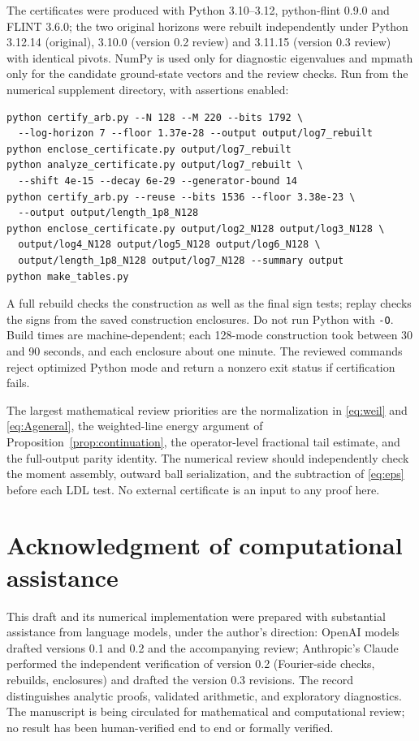 \documentclass[11pt]{article}
\numberwithin{equation}{section}
\theoremstyle{definition}
\theoremstyle{remark}
\begin{document}
The certificates were produced with Python 3.10--3.12, python-flint 0.9.0 and
FLINT 3.6.0; the two original horizons were rebuilt independently under Python
3.12.14 (original), 3.10.0 (version 0.2 review) and 3.11.15 (version 0.3
review) with identical pivots. NumPy is used only for diagnostic eigenvalues
and mpmath only for the candidate ground-state vectors and the review checks.
Run from the numerical supplement directory, with assertions enabled:
\begin{verbatim}
python certify_arb.py --N 128 --M 220 --bits 1792 \
  --log-horizon 7 --floor 1.37e-28 --output output/log7_rebuilt
python enclose_certificate.py output/log7_rebuilt
python analyze_certificate.py output/log7_rebuilt \
  --shift 4e-15 --decay 6e-29 --generator-bound 14
python certify_arb.py --reuse --bits 1536 --floor 3.38e-23 \
  --output output/length_1p8_N128
python enclose_certificate.py output/log2_N128 output/log3_N128 \
  output/log4_N128 output/log5_N128 output/log6_N128 \
  output/length_1p8_N128 output/log7_N128 --summary output
python make_tables.py
\end{verbatim}
A full rebuild checks the construction as well as the final sign tests;
replay checks the signs from the saved construction enclosures. Do not run
Python with \texttt{-O}. Build times are machine-dependent; each 128-mode
construction took between 30 and 90 seconds, and each enclosure about one
minute. The reviewed commands reject optimized Python mode and return a
nonzero exit status if certification fails.

The largest mathematical review priorities are the normalization in
\eqref{eq:weil} and \eqref{eq:Ageneral}, the weighted-line energy argument of
Proposition~\ref{prop:continuation}, the operator-level fractional tail
estimate, and the full-output parity identity. The numerical review should
independently check the moment assembly, outward ball serialization, and the
subtraction of \eqref{eq:eps} before each LDL test. No external certificate is
an input to any proof here.

\section*{Acknowledgment of computational assistance}
This draft and its numerical implementation were prepared with substantial
assistance from language models, under the author's direction: OpenAI models
drafted versions 0.1 and 0.2 and the accompanying review; Anthropic's Claude
performed the independent verification of version 0.2 (Fourier-side checks,
rebuilds, enclosures) and drafted the version 0.3 revisions. The record
distinguishes analytic proofs, validated arithmetic, and exploratory
diagnostics. The manuscript is being circulated for mathematical and
computational review; no result has been human-verified end to end or
formally verified.



\end{document}
